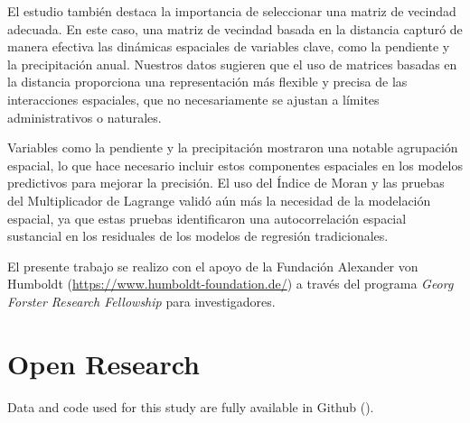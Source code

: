 \documentclass[
  manuscript=article,  
  layout=preprint,  
  year=2023,
  volume=0,
]{format}
\begin{document}
El estudio también destaca la importancia de seleccionar una matriz de vecindad adecuada. En este caso, una matriz de vecindad basada en la distancia capturó de manera efectiva las dinámicas espaciales de variables clave, como la pendiente y la precipitación anual. Nuestros datos sugieren que el uso de matrices basadas en la distancia proporciona una representación más flexible y precisa de las interacciones espaciales, que no necesariamente se ajustan a límites administrativos o naturales.

Variables como la pendiente y la precipitación mostraron una notable agrupación espacial, lo que hace necesario incluir estos componentes espaciales en los modelos predictivos para mejorar la precisión. El uso del Índice de Moran y las pruebas del Multiplicador de Lagrange validó aún más la necesidad de la modelación espacial, ya que estas pruebas identificaron una autocorrelación espacial sustancial en los residuales de los modelos de regresión tradicionales.

\begin{acknowledgement}
El presente trabajo se realizo con el apoyo de la Fundación Alexander von Humboldt (\url{https://www.humboldt-foundation.de/}) a través del programa \textit{Georg Forster Research Fellowship} para investigadores.

\end{acknowledgement}

\section{Open Research}
Data and code used for this study are fully available in Github (\url{}).

\printbibliography
\end{document}
